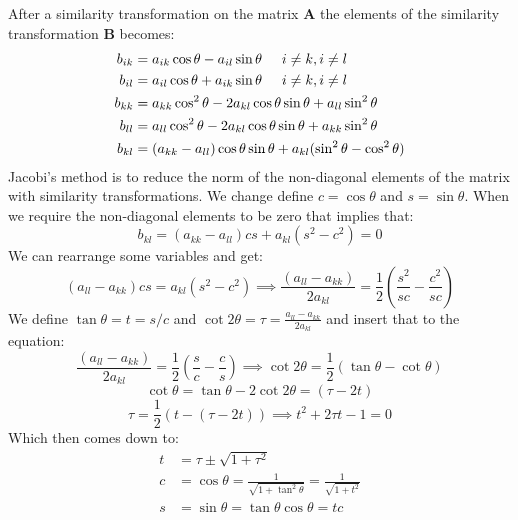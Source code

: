 After a similarity transformation on the matrix $\textbf{A}$ the elements of the similarity transformation $\textbf{B}$ becomes:
\begin{align*}
b_{ik} &= a_{ik} \cos \theta - a_{il} \sin \theta \hspace{0.5cm} i \neq k, i\neq l\\
b_{il} &= a_{il} \cos \theta + a_{ik} \sin \theta \hspace{0.5cm} i \neq k, i\neq l\\ 
b_{kk} &= a_{kk} \cos^2 \theta - 2a_{kl} \cos \theta \sin \theta + a_{ll} \sin^2 \theta \\
b_{ll} &= a_{ll} \cos^2 \theta - 2a_{kl} \cos \theta \sin \theta + a_{kk} \sin^2 \theta \\
b_{kl} &= (a_{kk} - a_{ll})\cos \theta \sin \theta + a_{kl} (\sin^2 \theta - \cos^2 \theta) \\
\end{align*}
Jacobi's method is to reduce the norm of the non-diagonal elements of the matrix with similarity transformations. We change define $c = \cos \theta$ and $s = \sin \theta$. When we require the non-diagonal elements to be zero that implies that:
\[
b_{kl} = (a_{kk} - a_{ll})cs + a_{kl} (s^2 - c^2) = 0
\]
We can rearrange some variables and get:
\[
(a_{ll}- a_{kk})cs = a_{kl} (s^2 - c^2) \implies \frac{(a_{ll} - a_{kk})}{2a_{kl}} = \frac{1}{2}\left(\frac{s^2}{sc} - \frac{c^2}{sc}\right)
\]
We define $\tan \theta = t = s/c$ and $\cot 2\theta = \tau = \frac{a_{ll} - a_{kk}}{2a_{kl}}$ and insert that to the equation:
\[
\frac{(a_{ll} - a_{kk})}{2a_{kl}} = \frac{1}{2}\left(\frac{s}{c} - \frac{c}{s}\right) \implies \cot 2\theta = \frac{1}{2}(\tan \theta - \cot \theta)
\]
\[
\cot \theta = \tan \theta - 2\cot 2\theta = (\tau - 2 t)
\]
\[
\tau = \frac{1}{2}(t- (\tau - 2t)) \implies t^2 + 2\tau t-1 = 0
\]
Which then comes down to:
\begin{align*}
t &= \tau \pm \sqrt{1+\tau^2}\\ 
c &= \cos \theta = \frac{1}{\sqrt{1+\tan^2\theta}} = \frac{1}{\sqrt{1+t^2}}\\
s &= \sin \theta = \tan \theta \cos \theta = t c\\
\end{align*}
